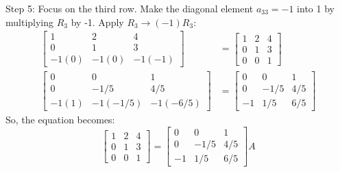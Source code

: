 \documentclass{article}
\begin{document}
Step 5: Focus on the third row. Make the diagonal element $a_{33}=-1$ into 1 by multiplying $R_3$ by -1.
Apply $R_3 \to (-1)R_3$:
\begin{align*} \begin{bmatrix} 1 & 2 & 4 \\ 0 & 1 & 3 \\ -1(0) & -1(0) & -1(-1) \end{bmatrix} &= \begin{bmatrix} 1 & 2 & 4 \\ 0 & 1 & 3 \\ 0 & 0 & 1 \end{bmatrix} \\ \begin{bmatrix} 0 & 0 & 1 \\ 0 & -1/5 & 4/5 \\ -1(1) & -1(-1/5) & -1(-6/5) \end{bmatrix} &= \begin{bmatrix} 0 & 0 & 1 \\ 0 & -1/5 & 4/5 \\ -1 & 1/5 & 6/5 \end{bmatrix}\end{align*}
So, the equation becomes:
\[ \begin{bmatrix} 1 & 2 & 4 \\ 0 & 1 & 3 \\ 0 & 0 & 1 \end{bmatrix} = \begin{bmatrix} 0 & 0 & 1 \\ 0 & -1/5 & 4/5 \\ -1 & 1/5 & 6/5 \end{bmatrix} A \]
\end{document}
